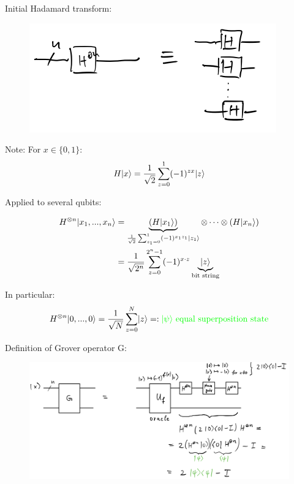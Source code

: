 Initial Hadamard transform: \\

\begin{figure}[H]
    \centering
    \includegraphics[scale=0.5]{chapters/res/initial-hadamard-transform.png}
\end{figure}
Note: For $x \in \{0, 1\}$:
\begin{equation}
    H \lvert x\rangle = \frac{1}{\sqrt{2}} \sum_{z = 0}^1 (-1)^{z x} \lvert z\rangle 
\end{equation}

Applied to several qubits:

\begin{align}
    H^{\otimes n} \lvert x_1, ..., x_n\rangle 
        &= \underbrace{(H\lvert x_1\rangle)}_{\frac{1}{\sqrt{2}} \sum_{z_1 = 0}^1 (-1)^{x_1 z_1} \lvert z_1\rangle}
            \otimes \cdots \otimes (H \lvert x_n\rangle) \\ 
        &= \frac{1}{\sqrt{2^n}}  \sum_{z = 0}^{2^n - 1} (-1)^{x \cdot z} \underbrace{\lvert z\rangle}_{\text{bit string}}
\end{align}

In particular: 
\begin{equation}
    H^{\otimes n} \lvert0, ..., 0\rangle = \frac{1}{\sqrt{N}} \sum_{z = 0}^{N} \lvert z\rangle =: {\color{green} \lvert\psi\rangle \text{ equal superposition state}}
\end{equation}

Definition of Grover operator G:

\begin{figure}[H]
    \centering
    \includegraphics[scale=0.4]{chapters/res/grover-operation-circuit.png}
\end{figure}

